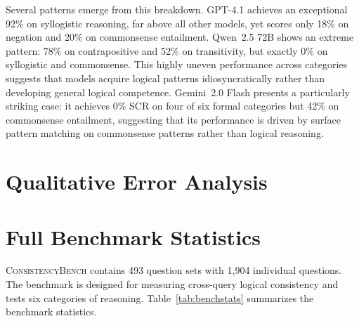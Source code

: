 \documentclass{article}
\newcommand{\bench}{\textsc{ConsistencyBench}}
\begin{document}
Several patterns emerge from this breakdown. GPT-4.1 achieves an exceptional 92\% on syllogistic reasoning, far above all other models, yet scores only 18\% on negation and 20\% on commonsense entailment. Qwen~2.5 72B shows an extreme pattern: 78\% on contrapositive and 52\% on transitivity, but exactly 0\% on syllogistic and commonsense. This highly uneven performance across categories suggests that models acquire logical patterns idiosyncratically rather than developing general logical competence. Gemini~2.0 Flash presents a particularly striking case: it achieves 0\% SCR on four of six formal categories but 42\% on commonsense entailment, suggesting that its performance is driven by surface pattern matching on commonsense patterns rather than logical reasoning.

\section{Qualitative Error Analysis}
\label{app:errors}



\section{Full Benchmark Statistics}
\label{app:benchmark}

\bench{} contains 493 question sets with 1,904 individual questions. The benchmark is designed for measuring cross-query logical consistency and tests six categories of reasoning. Table~\ref{tab:benchstats} summarizes the benchmark statistics.
\end{document}
